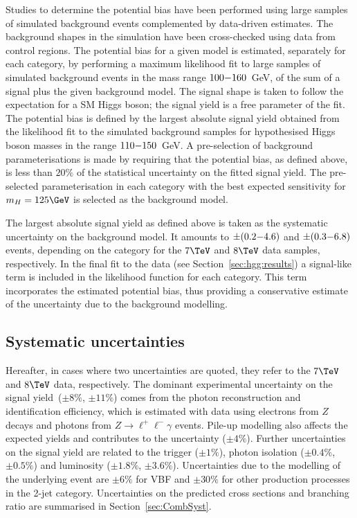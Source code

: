 \documentclass[final,3p,times,twocolumn]{elsarticle}
\begin{document}
Studies to determine the potential bias have been performed using 
large samples of simulated background events
complemented by data-driven estimates.
The background shapes in the simulation have been cross-checked using
data from control regions.  The potential bias for a given model is
estimated, separately for each category, by performing a maximum likelihood fit
to large samples of simulated background events in the mass range
$100{\--}160$~GeV, of the sum of a signal plus the given
background model.
The signal shape is taken to follow the expectation for a SM Higgs
boson; the signal yield is a free parameter of the fit.
The potential bias is defined by the largest absolute signal yield
obtained from the likelihood fit to the simulated background
samples for hypothesised Higgs boson masses
in the range $110{\--}150$~GeV. 
A pre-selection of background parameterisations is made by requiring that the potential
bias, as defined above, is less than $20\%$ of the statistical uncertainty
on the fitted signal yield.
The pre-selected parameterisation in each category with the best expected sensitivity
for $m_H=125\GeV$ is selected as the background model.

The largest absolute signal yield as defined above
is taken as the systematic uncertainty on the background model.
It amounts to $\pm(0.2{\--}4.6)$ and $\pm(0.3{\--}6.8)$ events, depending on
the category for the $7\TeV$ and $8\TeV$ data samples, respectively.
In the final fit to the data (see Section~\ref{sec:hgg:results})
a signal-like term is included in the likelihood function for each category.
This term incorporates the estimated potential bias, 
thus providing a conservative estimate of
the uncertainty due to the background modelling.

\subsection{Systematic uncertainties}
Hereafter, in cases where two uncertainties are quoted, they refer to the $7\TeV$ and $8\TeV$ data, respectively.
The dominant experimental uncertainty on the signal yield~($\pm8\%$, $\pm11\%$) 
comes from the photon reconstruction and identification efficiency, which is
estimated with data using electrons from $Z$ decays and photons
from $Z\to\ell^+\ell^-\gamma$ events.
Pile-up modelling also affects the expected yields and contributes to the
uncertainty ($\pm4\%$).  Further uncertainties on the signal yield are
related to the trigger ($\pm1\%$), photon isolation ($\pm0.4\%$, $\pm0.5\%$)
and luminosity ($\pm1.8\%$, $\pm3.6\%$).
Uncertainties due to the modelling of the underlying event are $\pm6\%$ for VBF and
$\pm30\%$ for other production processes in the 2-jet category.
Uncertainties on the predicted cross sections and branching ratio are summarised in Section~\ref{sec:CombSyst}.
\end{document}
